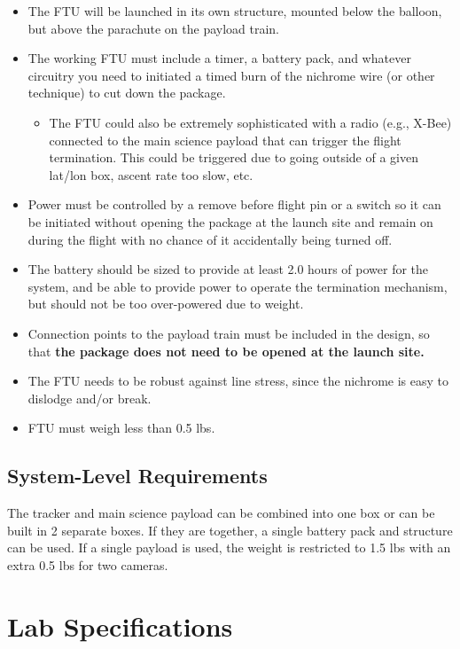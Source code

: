 \documentclass[11pt]{article}
\begin{document}
\begin{itemize}
  \item The FTU will be launched in its own structure, mounted below
    the balloon, but above the parachute on the payload train.
  \item The working FTU must include a timer, a battery pack, and
    whatever circuitry you need to initiated a timed burn of the
    nichrome wire (or other technique) to cut down the package.
    \begin{itemize}
      \item The FTU could also be extremely sophisticated with a radio
        (e.g., X-Bee) connected to the main science payload that can
        trigger the flight termination. This could be triggered due to
        going outside of a given lat/lon box, ascent rate too slow,
        etc.
    \end{itemize}
  \item Power must be controlled by a remove before flight pin or a
    switch so it can be initiated without opening the package at the
    launch site and remain on during the flight with no chance of it
    accidentally being turned off.
  \item The battery should be sized to provide at least 2.0 hours of
    power for the system, and be able to provide power to operate the
    termination mechanism, but should not be too over-powered due to
    weight.
  \item Connection points to the payload train must be included in the
    design, so that {\bf the package does not need to be opened at the
      launch site.}
  \item The FTU needs to be robust against line stress, since the
    nichrome is easy to dislodge and/or break.
  \item FTU must weigh less than 0.5 lbs.
\end{itemize}

\subsection{System-Level Requirements}
    
The tracker and main science payload can be combined into one box or
can be built in 2 separate boxes.  If they are together, a single
battery pack and structure can be used. If a single payload is used,
the weight is restricted to 1.5 lbs with an extra 0.5 lbs for two
cameras.

\section{Lab Specifications}
\end{document}
